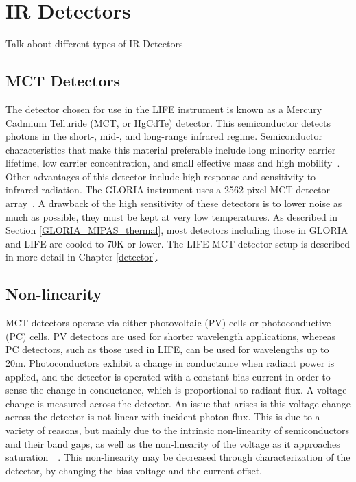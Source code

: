 \section{IR Detectors}
Talk about different types of IR Detectors

\subsection{MCT Detectors}
The detector chosen for use in the LIFE instrument is known as a Mercury Cadmium Telluride (MCT, or HgCdTe) detector. This semiconductor detects photons in the short-, mid-, and long-range infrared regime. Semiconductor characteristics that make this material preferable include long minority carrier lifetime, low carrier concentration, and small effective mass and high mobility~\citep{MCT_Detectors}. Other advantages of this detector include high response and sensitivity to infrared radiation. The GLORIA instrument uses a 2562-pixel MCT detector array~\citep{GLORIA_concept}. A drawback of the high sensitivity of these detectors is to lower noise as much as possible, they must be kept at very low temperatures. As described in Section \ref{GLORIA_MIPAS_thermal}, most detectors including those in GLORIA and LIFE are cooled to 70K or lower. The LIFE MCT detector setup is described in more detail in Chapter \ref{detector}.

\subsection{Non-linearity}
MCT detectors operate via either photovoltaic (PV) cells or photoconductive (PC) cells. PV detectors are used for shorter wavelength applications, whereas PC detectors, such as those used in LIFE, can be used for wavelengths up to 20\textmu m. Photoconductors exhibit a change in conductance when radiant power is applied, and the detector is operated with a constant bias current in order to sense the change in conductance, which is proportional to radiant flux. A voltage change is measured across the detector. An issue that arises is this voltage change across the detector is not linear with incident photon flux. This is due to a variety of reasons, but mainly due to the intrinsic non-linearity of semiconductors and their band gaps, as well as the non-linearity of the voltage as it approaches saturation~\citep{current_measurement_MCTs}~\citep{MCT_linearity}.  This non-linearity may be decreased through characterization of the detector, by changing the bias voltage and the current offset.

